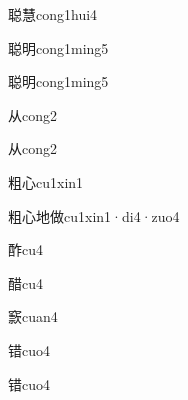 \begin{verbete}[15;15]{聪慧}{cong1hui4}
\end{verbete}
\begin{verbete}[15;8]{聪明}{cong1ming5}
\end{verbete}
\begin{verbete}[15;8]{聪明}{cong1ming5}
\end{verbete}
\begin{verbete}[4]{从}{cong2}
\end{verbete}
\begin{verbete*}[4]{从}{cong2}
\end{verbete*}
\begin{verbete}[11;4]{粗心}{cu1xin1}
\end{verbete}
\begin{verbete}[11;4;6;11]{粗心地做}{cu1xin1·di4·zuo4}
\end{verbete}
\begin{verbete}[12]{酢}{cu4}
\end{verbete}
\begin{verbete}[15]{醋}{cu4}
\end{verbete}
\begin{verbete}[17]{窾}{cuan4}
\end{verbete}
\begin{verbete}[13]{错}{cuo4}
\end{verbete}
\begin{verbete*}[13]{错}{cuo4}
\end{verbete*}

